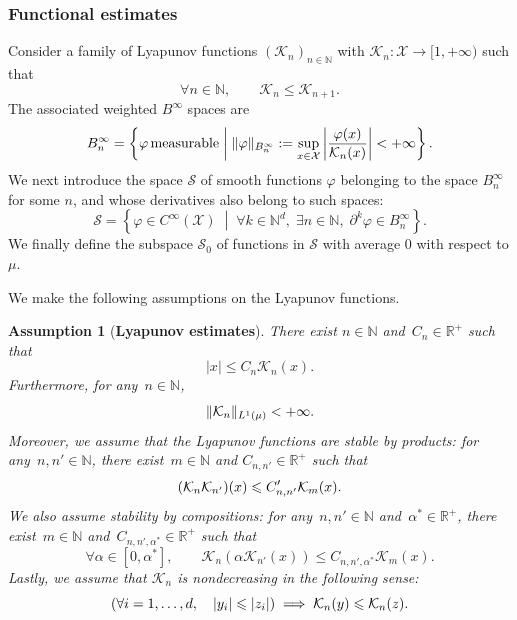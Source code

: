 \documentclass[11pt]{article}
\newcommand{\R}{\mathbb{R}}
\newcommand{\N}{\mathbb{N}}
\renewcommand{\S}{\mathscr{S}}
\renewcommand{\leq}{\leqslant}
\DeclarePairedDelimiter\norm{\lVert}{\rVert}
\DeclarePairedDelimiter\paren{\lparen}{\rparen}
\newtheorem{assumption}{Assumption}
\theoremstyle{definition}
\begin{document}
\subsubsection{Functional estimates}
\label{subsubsec:lyapunov_setting}
Consider a family of Lyapunov functions $(\mathcal{K}_n)_{n\in\N}$ with $\mathcal{K}_n \colon \mathcal{X} \to [1,+\infty)$ such that
\begin{equation}
	\forall n\in\N, \qquad \mathcal{K}_n \leq \mathcal{K}_{n+1}.
\end{equation}
The associated weighted $B^\infty$ spaces are
\begin{equation}
    B_n^\infty = \left\{\varphi \, \rm{measurable} \; \middle| \; \|\varphi\|_{B_n^\infty} := \sup _{x \in \mathcal{X}}\left| \frac{\varphi(x)}{\mathcal{K}_n(x)} \right| < +\infty\right\}.
\end{equation}
We next introduce the space $\S$ of smooth functions $\varphi$ belonging to the space $B^\infty_n$ for some $n$, and whose derivatives also belong to such spaces:
\begin{equation}
    \S = \left\{\varphi \in C^\infty(\mathcal{X}) \; \middle| \; \forall k \in \mathbb{N}^d, \; \exists n \in \mathbb{N}, \; \partial^k \varphi \in B_n^\infty\right\}.
\end{equation}
We finally define the subspace $\S_0$ of functions in $\S$ with average 0 with respect to $\mu$.

We make the following assumptions on the Lyapunov functions.

\begin{assumption}[{\bf Lyapunov estimates}]
\label{as:lyapunov}
There exist $n\in\N$ and~$C_n\in\R^+$ such that
\begin{equation}
	|x| \leq C_n\mathcal{K}_n(x).
	\label{eq:lyap_identity}
\end{equation}
Furthermore, for any~$n\in\N$,
\begin{equation}
	\norm{\mathcal{K}_n}_{L^1(\mu)} < +\infty.
	\label{eq:lyap_L1}
\end{equation}
Moreover, we assume that the Lyapunov functions are stable by products: for any~$n,n'\in\N$, there exist~$m\in\N$ and $C_{n,n'}\in\R^+$ such that
\begin{equation}
	\paren*{\mathcal{K}_n\mathcal{K}_{n'}}(x) \leq C'_{n,n'}\mathcal{K}_m(x).
	\label{eq:lyap_prod}
\end{equation}
We also assume stability by compositions: for any~$n,n'\in\N$ and~$\alpha^*\in\R^+$, there exist~$m\in\N$ and~$C_{n,n',\alpha^*}\in\R^+$ such that
\begin{equation}
	\forall\alpha \in [0,\alpha^*], \qquad \mathcal{K}_n(\alpha\mathcal{K}_{n'}(x)) \leq C_{n,n',\alpha^*}\mathcal{K}_m(x).
	\label{eq:lyap_comp}
\end{equation}
Lastly, we assume that $\mathcal{K}_n$ is nondecreasing in the following sense:
\begin{equation}
	\paren*{\forall i = 1,\dotsc,d, \quad |y_i| \leq |z_i|} \implies \mathcal{K}_n(y) \leq \mathcal{K}_n(z).
\end{equation}
\end{assumption}
\end{document}

